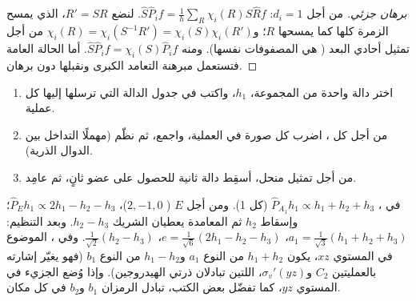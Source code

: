 \begin{proof}[برهان جزئي]
من أجل $d_i = 1$: $\hat S\hat P_if = \frac1h\sum_R\chi_i(R)\hat S\hat Rf$. لنضع $R' = SR$،
الذي يمسح الزمرة كلها كما يمسحها $R$؛ و$\chi_i(R) = \chi_i(S^{-1}R') =
\chi_i(S)\chi_i(R')$ من أجل تمثيل أحادي البعد ( هي
المصفوفات نفسها). ومنه $\hat S\hat P_if = \chi_i(S)\hat P_if$. أما الحالة
العامة فتستعمل مبرهنة التعامد الكبرى ونقبلها دون برهان.
\end{proof}

\begin{method}\label{met:b3:group-theory-applied:salc}
\begin{enumerate}
  \item اختر دالة واحدة من المجموعة، $h_1$، واكتب في جدول الدالة التي ترسلها
        إليها كل عملية.
  \item من أجل كل ، اضرب كل صورة في
         العملية، واجمع، ثم نظّم (مهملًا التداخل
        بين الدوال الذرية).
  \item من أجل تمثيل منحل، أسقِط دالة ثانية للحصول على
        عضو ثانٍ، ثم عامِد.
\end{enumerate}
\end{method}

\begin{example}\label{ex:b3:group-theory-applied:salcs}
في ، $\hat P_{A_1}h_1 \propto h_1 + h_2 + h_3$ (كل  1). ومن أجل $E$
( $2, -1, 0$)، $\hat P_Eh_1 \propto 2h_1 - h_2 - h_3$؛ وإسقاط $h_2$ ثم
المعامدة يعطيان الشريك $h_2 - h_3$. وبعد التنظيم: $a_1 =
\frac{1}{\sqrt3}(h_1 + h_2 + h_3)$، $e = \frac{1}{\sqrt6}(2h_1 - h_2 - h_3)$،
$\frac{1}{\sqrt2}(h_2 - h_3)$. وفي ، الموضوع في المستوي $xz$، يكون $h_1 + h_2$
من النوع $a_1$ و$h_1 - h_2$ من النوع $b_1$ (فهو يغيّر إشارته بالعمليتين $C_2$ و$\sigma_v'(yz)$،
اللتين تبادلان ذرتي الهيدروجين). وإذا وُضع الجزيء في المستوي $yz$، كما تفضّل بعض
الكتب، تبادل الرمزان $b_1$ و$b_2$ في كل مكان.
\end{example}

